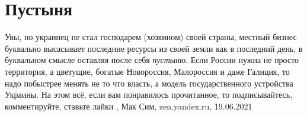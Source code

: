  
 
 
 
 
\chapter{Пустыня}

Увы, но украинец не стал господарем (хозяином) своей страны, местный бизнес
буквально высасывает последние ресурсы из своей земли как в последний день, в
буквальном смысле оставляя после себя \emph{пустыню}.  Если России нужна не
просто территория, а цветущие, богатые Новороссия, Малороссия и даже Галиция,
то надо побыстрее менять не то что власть, а модель государственного устройства
Украины. На этом всё, если вам понравилось прочитанное, то подписывайтесь,
комментируйте, ставьте лайки
, 
Мак Сим, zen.yandex.ru, 19.06.2021
